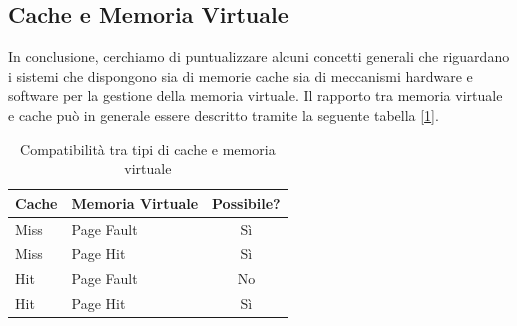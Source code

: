 \subsection{Cache e Memoria Virtuale}
In conclusione, cerchiamo di puntualizzare alcuni concetti generali che riguardano i sistemi che dispongono sia di memorie cache sia di meccanismi hardware e software per la gestione della memoria virtuale.
Il rapporto tra memoria virtuale e cache può in generale essere descritto tramite la seguente tabella [\ref{tab:cases_cache}].
\begin{table}[!h]
\centering
\begin{tabular}{|l|l|c|}
\hline
\textbf{Cache} & \textbf{Memoria Virtuale} & \textbf{Possibile?} \\
\hline
Miss & Page Fault & Sì \\
\hline
Miss & Page Hit & Sì \\
\hline
Hit & Page Fault & No \\
\hline
Hit & Page Hit & Sì \\
\hline
\end{tabular}
\caption{Compatibilità tra tipi di cache e memoria virtuale}
\label{tab:cases_cache}
\end{table}

